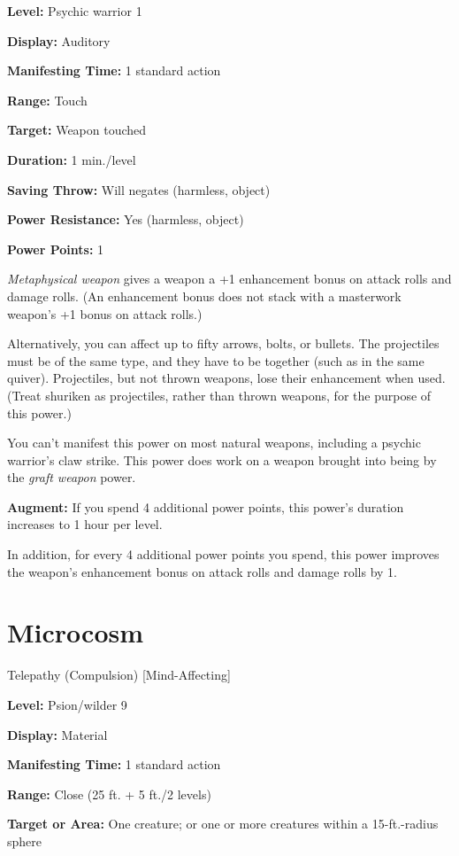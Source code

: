 \documentclass{article}
\begin{document}
\textbf{Level:} Psychic warrior 1

\textbf{Display:} Auditory

\textbf{Manifesting Time:} 1 standard action

\textbf{Range:} Touch

\textbf{Target:} Weapon touched

\textbf{Duration:} 1 min./level

\textbf{Saving Throw:} Will negates (harmless, object)

\textbf{Power Resistance:} Yes (harmless, object)

\textbf{Power Points:} 1

\textit{Metaphysical weapon }gives a weapon a +1 enhancement bonus on attack rolls 
and damage rolls. (An enhancement bonus does not stack with a masterwork weapon's 
+1 bonus on attack rolls.)

Alternatively, you can affect up to fifty arrows, bolts, or bullets. The projectiles 
must be of the same type, and they have to be together (such as in the same quiver). 
Projectiles, but not thrown weapons, lose their enhancement when used. (Treat shuriken 
as projectiles, rather than thrown weapons, for the purpose of this power.)

You can't manifest this power on most natural weapons, including a psychic warrior's 
claw strike. This power does work on a weapon brought into being by the \textit{graft 
weapon }power.

\textbf{Augment:} If you spend 4 additional power points, this power's duration 
increases to 1 hour per level.

In addition, for every 4 additional power points you spend, this power improves 
the weapon's enhancement bonus on attack rolls and damage rolls by 1.

\vspace{12pt}
\section*{Microcosm}

Telepathy (Compulsion) [Mind-Affecting]

\textbf{Level:} Psion/wilder 9

\textbf{Display:} Material

\textbf{Manifesting Time:} 1 standard action

\textbf{Range:} Close (25 ft. + 5 ft./2 levels)

\textbf{Target or Area:} One creature; or one or more creatures within a 15-ft.-radius 
sphere
\end{document}
